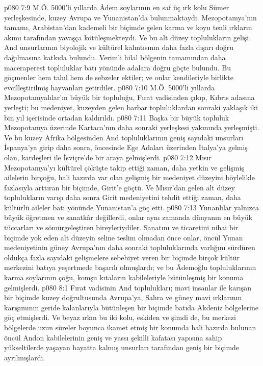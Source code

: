 \vs p080 7:9 M.Ö. 5000’li yıllarda Âdem soylarının en saf üç ırk kolu Sümer yerleşkesinde, kuzey Avrupa ve Yunanistan’da bulunmaktaydı. Mezopotamya’nın tamamı, Arabistan’dan kademeli bir biçimde gelen karma ve koyu tenli ırkların akımı tarafından yavaşça kötüleşmekteydi. Ve bu alt düzey toplulukların gelişi, And unsurlarının biyolojik ve kültürel kalıntısının daha fazla dışarı doğru dağılmasına katkıda bulundu. Verimli hilal bölgenin tamamından daha maceraperest topluluklar batı yönünde adalara doğru göçte bulundu. Bu göçmenler hem tahıl hem de sebzeler ektiler; ve onlar kendileriyle birlikte evcilleştirilmiş hayvanları getirdiler.
\vs p080 7:10 M.Ö. 5000’li yıllarda Mezopotamyalılar’ın büyük bir topluluğu, Fırat vadisinden çıkıp, Kıbrıs adasına yerleşti; bu medeniyet, kuzeyden gelen barbar topluluklardan sonraki yaklaşık iki bin yıl içerisinde ortadan kaldırıldı.
\vs p080 7:11 Başka bir büyük topluluk Mezopotamya üzerinde Kartaca’nın daha sonraki yerleşkesi yakınında yerleşmişti. Ve bu kuzey Afrika bölgesinden And topluluklarının geniş sayıdaki unsurları İspanya’ya girip daha sonra, öncesinde Ege Adaları üzerinden İtalya’ya gelmiş olan, kardeşleri ile İsviçre’de bir araya gelmişlerdi.
\vs p080 7:12 Mısır Mezopotamya’yı kültürel çöküşte takip ettiği zaman, daha yetkin ve gelişmiş ailelerin birçoğu, hali hazırda var olan gelişmiş bir medeniyet düzeyini böylelikle fazlasıyla arttıran bir biçimde, Girit’e göçtü. Ve Mısır’dan gelen alt düzey toplulukların varışı daha sonra Girit medeniyetini tehdit ettiği zaman, daha kültürlü aileler batı yönünde Yunanistan’a göç etti.
\vs p080 7:13 Yunanlılar yalnızca büyük öğretmen ve sanatkâr değillerdi, onlar aynı zamanda dünyanın en büyük tüccarları ve sömürgeleştiren bireyleriydiler. Sanatını ve ticaretini nihai bir biçimde yok eden alt düzeyin seline teslim olmadan önce onlar, öncül Yunan medeniyetinin güney Avrupa’nın daha sonraki topluluklarında varlığını sürdüren oldukça fazla sayıdaki gelişmelere sebebiyet veren bir biçimde birçok kültür merkezini batıya yeşertmede başarılı olmuşlardı; ve bu Âdemoğlu topluluklarının karma soylarının çoğu, komşu kıtaların kabileleriyle bütünleşmiş bir konuma gelmişlerdi.
\vs p080 8:1 Fırat vadisinin And toplulukları; mavi insanlar ile karışan bir biçimde kuzey doğrultusunda Avrupa’ya, Sahra ve güney mavi ırklarının karışımının geride kalanlarıyla bütünleşen bir biçimde batıda Akdeniz bölgelerine göç etmişlerdi. Ve beyaz ırkın bu iki kolu, eskiden ve şimdi de, bu merkezi bölgelerde uzun süreler boyunca ikamet etmiş bir konumda hali hazırda bulunan öncül Andon kabilelerinin geniş ve yassı şekilli kafatası yapısına sahip yükseltilerde yaşayan hayatta kalmış unsurları tarafından geniş bir biçimde ayrılmışlardı.

